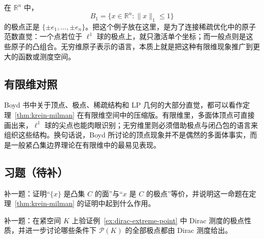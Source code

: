 \begin{example}\label{ex:l1-ball-extreme-points}
在 $\mathbb R^n$ 中，
\[
B_1=\{x\in\mathbb R^n:\|x\|_1\le 1\}
\]
的极点正是 $\{\pm e_1,\dots,\pm e_n\}$。把这个例子放在这里，是为了连接稀疏优化中的原子范数直觉：一个点若位于 $\ell^1$ 球的极点上，就只激活单个坐标；而一般点则是这些原子的凸组合。无穷维原子表示的语言，本质上就是把这种有限维现象推广到更大的函数或测度空间。
\end{example}

\subsection*{有限维对照}

Boyd 书中关于顶点、极点、稀疏结构和 LP 几何的大部分直觉，都可以看作定理~\ref{thm:krein-milman} 在有限维空间中的压缩版。有限维里，多面体顶点可直接画出来，$\ell^1$ 球的尖点也能肉眼识别；无穷维里则必须借助极点与闭凸包的语言来组织这些结构。换句话说，Boyd 所讨论的顶点现象并不是偶然的多面体事实，而是一般紧凸集边界理论在有限维中的最易见表现。

\subsection*{习题（待补）}

\begin{exercise}[极点与面占位]\label{exr:extreme-point-face-placeholder}
补一题：证明“$\{x\}$ 是凸集 $C$ 的面”与“$x$ 是 $C$ 的极点”等价，并说明这一命题在定理~\ref{thm:krein-milman} 的证明中起到什么作用。
\end{exercise}

\begin{exercise}\label{exr:dirac-measure-placeholder}
补一题：在紧空间 $K$ 上验证例~\ref{ex:dirac-extreme-point} 中 Dirac 测度的极点性质，并进一步讨论哪些条件下 $\mathcal P(K)$ 的全部极点都由 Dirac 测度给出。
\end{exercise}
